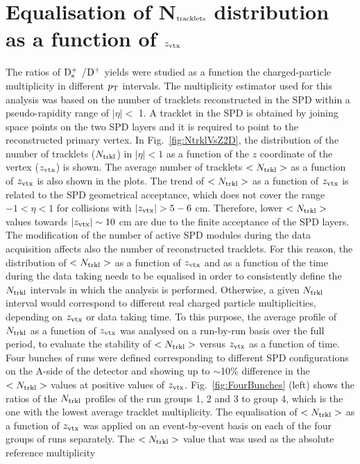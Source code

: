 \section{Equalisation of N$_{\rm tracklets}$ distribution as a function of $z_{\rm vtx}$}
\label{sec:zVxtEq}
The ratios of ${\rm D_s^+}$ /${\rm D^+}$ yields were studied as a 
function the charged-particle multiplicity in different $p_{\rm T}$ intervals.
The multiplicity estimator used for this analysis was based on the number 
of tracklets reconstructed in the SPD within a 
pseudo-rapidity range of $|\eta| <$ 1. A tracklet in the SPD is obtained by
joining space points on the two SPD layers and it is required to point to 
the reconstructed primary vertex. 
In Fig.~\ref{fig:NtrklVsZ2D}, the distribution of the number of tracklets ($N_{\rm trkl}$) in $|\eta|<1$ as a function
of the $z$ coordinate of the vertex ($z_{\rm vtx}$) is shown.
 The average number of tracklets $<N_{\rm trkl}>$ as a function of $z_{\rm vtx}$ is also shown in the plots.
 The trend of $<N_{\rm trkl}>$ as a function of $z_{\rm vtx}$ is related to the SPD geometrical acceptance,
 which does not cover the range $-1 < \eta < 1$ for collisions with $|\zVtx|> 5-6$ cm.
 Therefore, lower $<N_{\rm trkl}>$ values towards $|z_{\rm vtx}| \sim 10 $ cm are due to the 
 finite acceptance of the SPD layers. 
The modification of the number of active SPD modules during the data acquisition 
 affects also the number of reconstructed tracklets.
 For this reason, the distribution of $<N_{\rm trkl}>$ as a function of $z_{\rm vtx}$ and as a function of the time
 during the data taking needs to be equalised 
in order to consistently define the $N_{\rm trkl}$ intervals in which the analysis is performed.
Otherwise, a given $N_{\rm trkl}$ interval would correspond to different real charged particle
multiplicities, depending on $z_{\rm vtx}$ or data taking time.
To this purpose, the average profile of $N_{\rm trkl}$ as a function of $z_{\rm vtx}$ was analysed on a run-by-run basis 
over the full period, to evaluate the stability of $<N_{\rm trkl}>$ versus $z_{\rm vtx}$ 
as a function of time. Four bunches of runs were defined corresponding to different SPD
configurations on the A-side of the detector and showing up to $\sim$10\% difference in the $<N_{\rm trkl}>$ values at positive values 
of $z_{\rm vtx}$. Fig.~\ref{fig:FourBunches} (left) shows the ratios of the $N_{\rm trkl}$ profiles
of the run groups 1, 2 and 3 to group 4, which is the one with the lowest average tracklet multiplicity.
 The equalisation of $<N_{\rm trkl}>$ as a function of $z_{\rm vtx}$ was applied on an 
 event-by-event basis on each of the four groups of runs separately.
The $<N_{\rm trkl}>$ value that was used as the absolute reference multiplicity 
